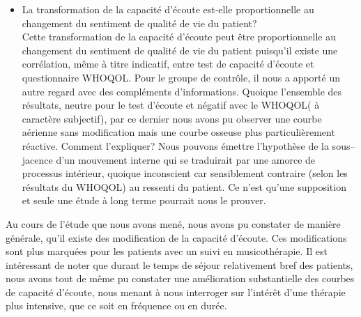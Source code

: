 \begin{itemize}
 	\item La transformation de la capacité d'écoute est-elle  proportionnelle au changement 
 	du sentiment de qualité de vie du patient?
 	\\
   Cette transformation de la capacité d'écoute peut être proportionnelle au changement du sentiment de 
   qualité de vie du patient puisqu'il existe une corrélation, même à titre indicatif, entre test de capacité 
   d'écoute et questionnaire 
   WHOQOL. 
 \newline 
     Pour le groupe de contrôle, il nous a
 apporté un autre regard avec des compléments d'informations. Quoique l'ensemble des résultats, 
 neutre pour le
 test d'écoute et négatif  avec le WHOQOL( à caractère subjectif),  par ce dernier nous avons pu observer 
 une 
 courbe 
 aérienne
 sans modification mais une courbe osseuse plus
 particulièrement réactive. Comment l'expliquer?
 Nous pouvons émettre l'hypothèse de   %
 la sous--jacence 
 d'un mouvement interne qui se traduirait par 
 une amorce de
 processus intérieur,  quoique inconscient car sensiblement contraire (selon les résultats du WHOQOL) 
 au ressenti du patient. Ce n'est qu'une supposition et seule une étude à long terme pourrait nous le 
 prouver.
  
 
    \end{itemize}
  
  
 Au cours de l'étude que nous avons mené, nous avons pu constater de manière générale, 
 qu'il existe des modification de la capacité d'écoute.
 Ces modifications sont plus marquées pour les patients avec un suivi en musicothérapie.
 \newline 
 Il est  intéressant de noter que durant le temps de séjour 
 relativement bref des patients, nous avons tout de même pu constater une amélioration substantielle 
 des courbes de capacité d'écoute, nous menant à nous interroger sur l'intérêt d'une thérapie plus 
 intensive, que ce soit en fréquence ou en durée. 
 
